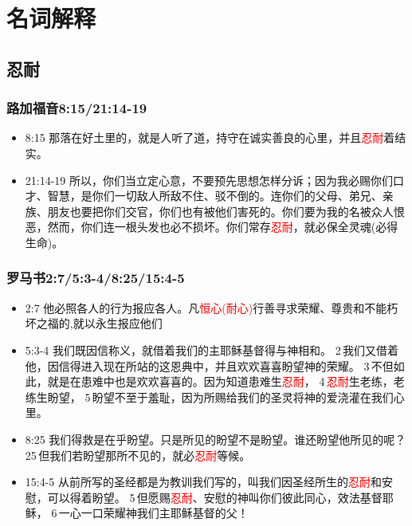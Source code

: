 
\section{名词解释}

\subsection{忍耐}
\subsubsection{路加福音8:15/21:14-19}
\begin{itemize}[noitemsep]
\item 8:15 那落在好土里的，就是人听了道，持守在诚实善良的心里，并且\textcolor{red}{忍耐}着结实。
\item 21:14-19 所以，你们当立定心意，不要预先思想怎样分诉；因为我必赐你们口才、智慧，是你们一切敌人所敌不住、驳不倒的。连你们的父母、弟兄、亲族、朋友也要把你们交官，你们也有被他们害死的。你们要为我的名被众人恨恶，然而，你们连一根头发也必不损坏。你们常存\textcolor{red}{忍耐}，就必保全灵魂(必得生命)。
\end{itemize}


\subsubsection{罗马书2:7/5:3-4/8:25/15:4-5} 
\begin{itemize}[noitemsep]
\item 2:7 他必照各人的行为报应各人。凡\textcolor{red}{恒心(耐心)}行善寻求荣耀、尊贵和不能朽坏之福的,就以永生报应他们
\item 5:3-4 我们既因信称义，就借着我们的主耶稣基督得与神相和。 2 我们又借着他，因信得进入现在所站的这恩典中，并且欢欢喜喜盼望神的荣耀。 3 不但如此，就是在患难中也是欢欢喜喜的。因为知道患难生\textcolor{red}{忍耐}， 4 \textcolor{red}{忍耐}生老练，老练生盼望， 5 盼望不至于羞耻，因为所赐给我们的圣灵将神的爱浇灌在我们心里。
\item 8:25 我们得救是在乎盼望。只是所见的盼望不是盼望。谁还盼望他所见的呢？25 但我们若盼望那所不见的，就必\textcolor{red}{忍耐}等候。
\item 15:4-5 从前所写的圣经都是为教训我们写的，叫我们因圣经所生的\textcolor{red}{忍耐}和安慰，可以得着盼望。 5 但愿赐\textcolor{red}{忍耐}、安慰的神叫你们彼此同心，效法基督耶稣， 6 一心一口荣耀神我们主耶稣基督的父！
\end{itemize}



